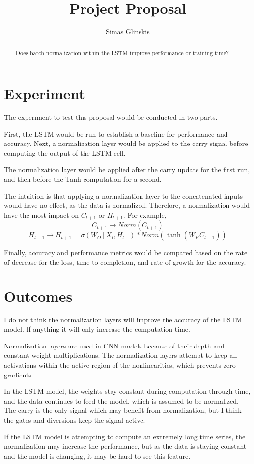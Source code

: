 \documentclass[]{article}
\title{Project Proposal}
\author{Simas Glinskis}
\begin{document}
\maketitle
\begin{abstract}
	Does batch normalization within the LSTM improve performance or training time?
\end{abstract}
\section*{Experiment}
The experiment to test this proposal would be conducted in two parts. 

First, the LSTM would be run to establish a baseline for performance and accuracy. Next, a normalization layer would be applied to the carry signal before computing the output of the LSTM cell.

The normalization layer would be applied after the carry update for the first run, and then before the Tanh computation for a second. 

The intuition is that applying a normalization layer to the concatenated inputs would have no effect, as the data is normalized. Therefore, a normalization would have the most impact on $C_{t+1}$ or $H_{t+1}$. For example,
\[
C_{t+1} \rightarrow Norm(C_{t+1})
\]
\[
H_{t+1} \rightarrow H_{t+1} = \sigma(W_O[X_t,H_t])*Norm(\tanh(W_HC_{t+1}))
\]

Finally, accuracy and performance metrics would be compared based on the rate of decrease for the loss, time to completion, and rate of growth for the accuracy. 

\section*{Outcomes}
I do not think the normalization layers will improve the accuracy of the LSTM model. If anything it will only increase the computation time. 

Normalization layers are used in CNN models because of their depth and constant weight multiplications. The normalization layers attempt to keep all activations within the active region of the nonlinearities, which prevents zero gradients. 

In the LSTM model, the weights stay constant during computation through time, and the data continues to feed the model, which is assumed to be normalized. The carry is the only signal which may benefit from normalization, but I think the gates and diversions keep the signal active.

If the LSTM model is attempting to compute an extremely long time series, the normalization may increase the performance, but as the data is staying constant and the model is changing, it may be hard to see this feature.
\end{document}
